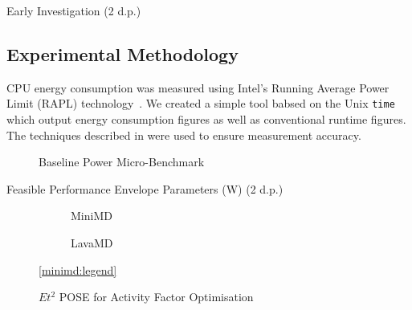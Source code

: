 \begin{table}
\centering
\caption{Early Investigation (2 d.p.)}

\end{table} 



\subsection{Experimental Methodology}
CPU energy consumption was measured using Intel's Running Average Power Limit (RAPL) technology~\cite{david:2010aa}.
We created a simple tool babsed on the Unix \texttt{time} which output energy consumption figures as well as conventional runtime figures.
The techniques described in \cite{hackenberg:2013aa} were used to ensure measurement accuracy. 


\begin{figure}[ht]                                                               
\centering                                                                      
\lstset{basicstyle=\ttfamily\footnotesize\bfseries, frame=tb} %
              
\caption{Baseline Power Micro-Benchmark}                            
\label{fig:microbench}                                                           
\end{figure}  


\begin{table}
\centering
\caption{Feasible Performance Envelope Parameters (W) (2 d.p.)}

\end{table} 

\begin{figure}[t]%
	\providecommand{\plotwidth}{.95\linewidth}
  \begin{subfigure}[t]{.5\linewidth}%
    \caption{MiniMD}%
  \end{subfigure}%
  \begin{subfigure}[t]{.5\linewidth}%
    \caption{LavaMD}%
  \end{subfigure}%
  \begin{center}%
    \ref{minimd:legend}%
  \end{center}%
  \caption{$Et^2$ POSE for Activity Factor Optimisation}%
  \label{fig:minimd}%
\end{figure}

